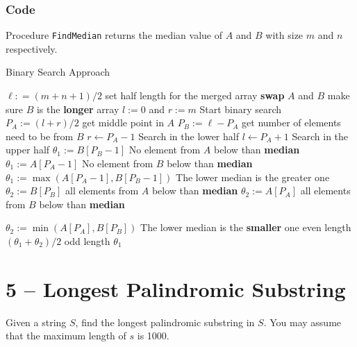 \documentclass[a4paper,12pt]{article}
\begin{document}
\subsubsection{Code}
Procedure \texttt{FindMedian} returns the median value of $A$ and $B$ with size $m$ and $n$ respectively.
\setcounter{algorithm}{0}
\begin{algorithm}[H]
\caption{Binary Search Approach}
\begin{algorithmic}[1]
\State $\ell: = (m + n + 1)/2$ \Comment set half length for the merged array
\State \textbf{swap} $A$ and $B$ \Comment make sure $B$ is the \textbf{longer} array
\EndIf
\State $l := 0$ and $r:=m$ \Comment Start binary search
\State $P_A := (l+r)/2$ \Comment get middle point in $A$
\State $P_B := \ell - P_A$ \Comment get number of elements need to be from $B$
\State $r \gets P_A -1 $ \Comment Search in the lower half
\State $l \gets P_A +1 $ \Comment Search in the upper half
\Else
{}
\State $\theta_1 := B[P_B-1]$ \Comment No element from $A$ below than \textbf{median}
\State $\theta_1 := A[P_A-1]$ \Comment No element from $B$ below than \textbf{median}
\Else 
\State $\theta_1 := \max(A[P_A - 1], B[P_B-1])$ \Comment The lower median is the greater one
\EndIf
{}
\State $\theta_2 := B[P_B]$ \Comment all elements from $A$ below than \textbf{median}
\State $\theta_2 := A[P_A]$ \Comment all elements from $B$ below than \textbf{median}
\Else
{}
\end{algorithmic}
\end{algorithm}

\begin{algorithm}[H]
\begin{algorithmic}[1]
\State $\theta_2 := \min(A[P_A], B[P_B])$ \Comment The lower median is the \textbf{smaller} one
\EndIf
\EndIf
{} \Comment even length
\State \Return $(\theta_1 + \theta_2)/2$
\Else \Comment odd length
\State \Return $\theta_1$
\EndIf
\EndWhile
\EndProcedure
\end{algorithmic}
\end{algorithm}

\section{5 -- Longest Palindromic Substring}
Given a string $S$, find the longest palindromic substring in $S$. You may assume that the maximum length of $s$ is 1000.
\end{document}

